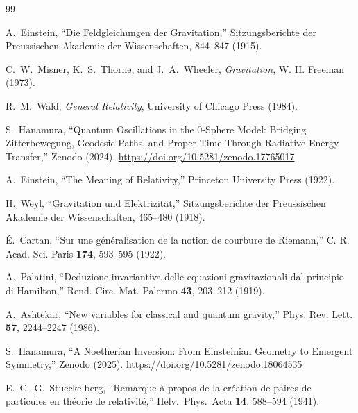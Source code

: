 \documentclass[%
 reprint,
 amsmath,amssymb,
 aps,
 prb,
]{revtex4-2}
\numberwithin{equation}{section}
\begin{document}
\begin{thebibliography}{99}

A.~Einstein,
``Die Feldgleichungen der Gravitation,''
Sitzungsberichte der Preussischen Akademie der Wissenschaften, 844--847 (1915).

C.~W.~Misner, K.~S.~Thorne, and J.~A.~Wheeler,
\textit{Gravitation},
W. H. Freeman (1973).

R.~M.~Wald,
\textit{General Relativity},
University of Chicago Press (1984).

S.~Hanamura,
``Quantum Oscillations in the 0-Sphere Model: Bridging Zitterbewegung, Geodesic Paths, and Proper Time Through Radiative Energy Transfer,''
Zenodo (2024).
\href{https://doi.org/10.5281/zenodo.17765017}{https://doi.org/10.5281/zenodo.17765017}

A.~Einstein,
``The Meaning of Relativity,''
Princeton University Press (1922).

H.~Weyl,
``Gravitation und Elektrizit{\"a}t,''
Sitzungsberichte der Preussischen Akademie der Wissenschaften, 465--480 (1918).

{\'E}.~Cartan,
``Sur une g{\'e}n{\'e}ralisation de la notion de courbure de Riemann,''
C. R. Acad. Sci. Paris \textbf{174}, 593--595 (1922).

A.~Palatini,
``Deduzione invariantiva delle equazioni gravitazionali dal principio di Hamilton,''
Rend. Circ. Mat. Palermo \textbf{43}, 203--212 (1919).

A.~Ashtekar,
``New variables for classical and quantum gravity,''
Phys. Rev. Lett. \textbf{57}, 2244--2247 (1986).

S.~Hanamura,
``A Noetherian Inversion: From Einsteinian Geometry to Emergent Symmetry,''
Zenodo (2025).
\href{https://doi.org/10.5281/zenodo.18064535}{https://doi.org/10.5281/zenodo.18064535}

E.~C.~G.~Stueckelberg,
``Remarque {\`a} propos de la cr{\'e}ation de paires de particules en th{\'e}orie de relativit{\'e},''
Helv.\ Phys.\ Acta {\bf 14}, 588--594 (1941).


\end{thebibliography}
\end{document}

